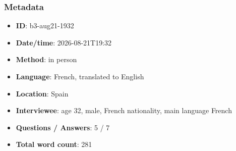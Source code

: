 \subsubsection*{Metadata}
\begin{itemize}
  \item \textbf{ID}: b3-aug21-1932
  \item \textbf{Date/time}: 2026-08-21T19:32
  \item \textbf{Method}: in person
  \item \textbf{Language}: French, translated to English
  \item \textbf{Location}: Spain
  \item \textbf{Interviewee}: age 32, male, French nationality, main language French
  \item \textbf{Questions / Answers}: 5 / 7
  \item \textbf{Total word count}: 281
\end{itemize}
